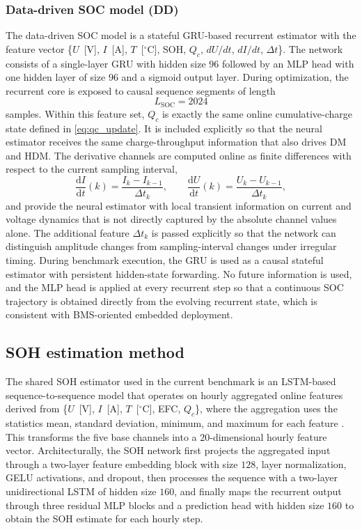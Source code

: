 \documentclass[review,nopreprintline]{elsarticle}
\begin{document}
\subsubsection{Data-driven SOC model (DD)}
The data-driven SOC model is a stateful GRU-based recurrent estimator with the feature vector \{$U$~[V], $I$~[A], $T$~[$^\circ$C], SOH, $Q_c$, $dU/dt$, $dI/dt$, $\Delta t$\}. The network consists of a single-layer GRU with hidden size $96$ followed by an MLP head with one hidden layer of size $96$ and a sigmoid output layer. During optimization, the recurrent core is exposed to causal sequence segments of length
\begin{equation}
    L_{\mathrm{SOC}} = 2024
\end{equation}
samples. Within this feature set, $Q_c$ is exactly the same online cumulative-charge state defined in \eqref{eq:qc_update}. It is included explicitly so that the neural estimator receives the same charge-throughput information that also drives DM and HDM. The derivative channels are computed online as finite differences with respect to the current sampling interval,
\begin{equation}
    \frac{\mathrm{d}I}{\mathrm{d}t}(k)=\frac{I_k-I_{k-1}}{\Delta t_k},
    \qquad
    \frac{\mathrm{d}U}{\mathrm{d}t}(k)=\frac{U_k-U_{k-1}}{\Delta t_k},
    \label{eq:derivative_features}
\end{equation}
and provide the neural estimator with local transient information on current and voltage dynamics that is not directly captured by the absolute channel values alone. The additional feature $\Delta t_k$ is passed explicitly so that the network can distinguish amplitude changes from sampling-interval changes under irregular timing. During benchmark execution, the GRU is used as a causal stateful estimator with persistent hidden-state forwarding. No future information is used, and the MLP head is applied at every recurrent step so that a continuous SOC trajectory is obtained directly from the evolving recurrent state, which is consistent with BMS-oriented embedded deployment.

\subsection{SOH estimation method}
The shared SOH estimator used in the current benchmark is an LSTM-based sequence-to-sequence model that operates on hourly aggregated online features derived from \{$U$~[V], $I$~[A], $T$~[$^\circ$C], EFC, $Q_c$\}, where the aggregation uses the statistics mean, standard deviation, minimum, and maximum for each feature \cite{Embedded_AI_SOH_badData,gouEnsembleLearningBasedDataDriven2021,liOnlineCapacityEstimation2021,rzepkaNeuralNetworkArchitecture2023a}. This transforms the five base channels into a $20$-dimensional hourly feature vector. Architecturally, the SOH network first projects the aggregated input through a two-layer feature embedding block with size $128$, layer normalization, GELU activations, and dropout, then processes the sequence with a two-layer unidirectional LSTM of hidden size $160$, and finally maps the recurrent output through three residual MLP blocks and a prediction head with hidden size $160$ to obtain the SOH estimate for each hourly step.
\end{document}
